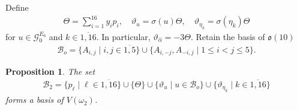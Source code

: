 \documentclass[12pt]{article}
\numberwithin{equation}{section}
\newtheorem{proposition}[theorem]{Proposition}
\theoremstyle{definition}
\theoremstyle{remark}
\begin{document}
Define 
\begin{eqnarray}
	\Theta=\sum_{i=1}^{16}y_ip_i,\quad\vartheta_{u}=\sigma(u)\Theta,\quad\vartheta_{\eta_k}=\sigma(\eta_k)\Theta \label{4.35}
\end{eqnarray}
for $u\in\mathscr{G}^{E_6}_0$ and $k\in\overline{1,16}$. In particular, $\vartheta_{\widehat{\alpha}}=-3\Theta$.
Retain the basis of $\mathfrak{o}(10)$
\begin{eqnarray}
	\mathcal{B}_o=\{A_{i,j}\mid i,j\in\overline{1,5}\}\cup\{A_{i,-j},A_{-i,j}\mid 1\leqslant i<j\leqslant 5\}.
\end{eqnarray}
\begin{proposition}
	The set
	\begin{align}
		\mathcal{B}_2=\{p_\ell\mid \ell\in\overline{1,16}\}\cup\{\Theta\}\cup\{\vartheta_{u}\mid u\in\mathcal{B}_o\}\cup\{\vartheta_{\eta_k}\mid k\in\overline{1,16}\}
	\end{align}
	forms a basis of $V(\omega_2)$.
\end{proposition}
\end{document}

